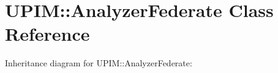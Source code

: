 \hypertarget{classUPIM_1_1AnalyzerFederate}{}\section{U\+P\+IM\+:\+:Analyzer\+Federate Class Reference}
\label{classUPIM_1_1AnalyzerFederate}


Inheritance diagram for U\+P\+IM\+:\+:Analyzer\+Federate\+:

